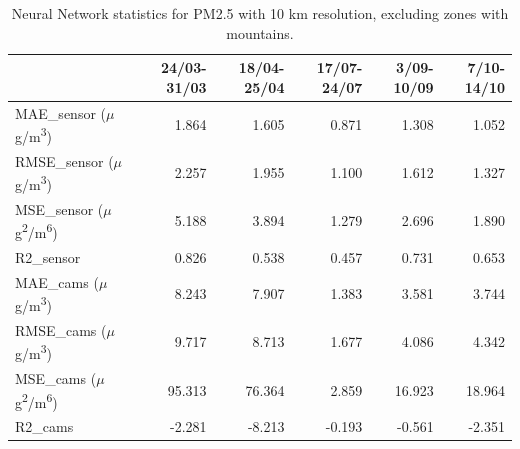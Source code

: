 \begin{table}[H]
\begin{tabular}{lrrrrr}
\toprule
 &  24/03-31/03 &  18/04-25/04 &  17/07-24/07 &  3/09-10/09 &  7/10-14/10 \\
\midrule
 MAE\_sensor ($\mu$g/m\textsuperscript{3})&        1.864 &        1.605 &        0.871 &       1.308 &       1.052 \\
RMSE\_sensor ($\mu$g/m\textsuperscript{3})&        2.257 &        1.955 &        1.100 &       1.612 &       1.327 \\
 MSE\_sensor ($\mu$g\textsuperscript{2}/m\textsuperscript{6})&        5.188 &        3.894 &        1.279 &       2.696 &       1.890 \\
  R2\_sensor &        0.826 &        0.538 &        0.457 &       0.731 &       0.653 \\
   MAE\_cams ($\mu$g/m\textsuperscript{3})&        8.243 &        7.907 &        1.383 &       3.581 &       3.744 \\
  RMSE\_cams ($\mu$g/m\textsuperscript{3})&        9.717 &        8.713 &        1.677 &       4.086 &       4.342 \\
   MSE\_cams ($\mu$g\textsuperscript{2}/m\textsuperscript{6})&       95.313 &       76.364 &        2.859 &      16.923 &      18.964 \\
    R2\_cams &       -2.281 &       -8.213 &       -0.193 &      -0.561 &      -2.351 \\
\bottomrule
\end{tabular}
\caption{Neural Network statistics for PM2.5 with 10 km resolution, excluding zones with mountains.}
\end{table}
